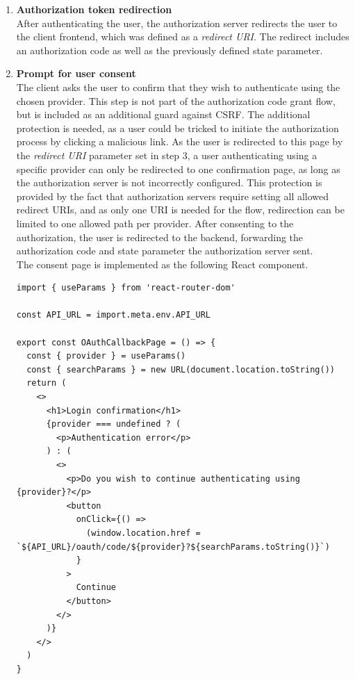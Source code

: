 \begin{enumerate}
    \item \textbf{Authorization token redirection} \\
    After authenticating the user, the authorization server redirects the user to the client frontend, which was defined as a \textit{redirect URI}.
    The redirect includes an authorization code as well as the previously defined state parameter.
    \item \textbf{Prompt for user consent} \\
    The client asks the user to confirm that they wish to authenticate using the chosen provider.
    This step is not part of the authorization code grant flow, but is included as an additional guard against CSRF.
    The additional protection is needed, as a user could be tricked to initiate the authorization process by clicking a malicious link.
    As the user is redirected to this page by the \textit{redirect URI} parameter set in step 3, a user authenticating using a specific provider can only be redirected to one confirmation page, as long as the authorization server is not incorrectly configured.
    This protection is provided by the fact that authorization servers require setting all allowed redirect URIs, and as only one URI is needed for the flow, redirection can be limited to one allowed path per provider.
    After consenting to the authorization, the user is redirected to the backend, forwarding the authorization code and state parameter the authorization server sent. \\
    The consent page is implemented as the following React \citep{noauthor_react_nodate} component.

\begin{lstlisting}[style=ES6, caption={User consent page}]
import { useParams } from 'react-router-dom'

const API_URL = import.meta.env.API_URL

export const OAuthCallbackPage = () => {
  const { provider } = useParams()
  const { searchParams } = new URL(document.location.toString())
  return (
    <>
      <h1>Login confirmation</h1>
      {provider === undefined ? (
        <p>Authentication error</p>
      ) : (
        <>
          <p>Do you wish to continue authenticating using {provider}?</p>
          <button
            onClick={() =>
              (window.location.href = `${API_URL}/oauth/code/${provider}?${searchParams.toString()}`)
            }
          >
            Continue
          </button>
        </>
      )}
    </>
  )
}
\end{lstlisting}


\end{enumerate}

